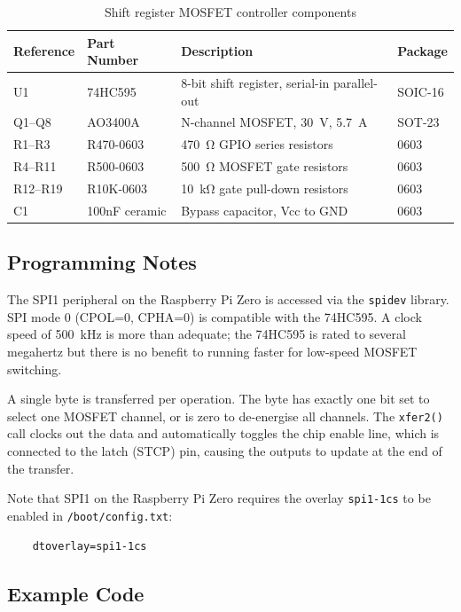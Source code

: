 \begin{table}[h]
\centering
\begin{tabular}{llll}
\hline
\textbf{Reference} & \textbf{Part Number} & \textbf{Description} & \textbf{Package} \\
\hline
U1      & 74HC595           & 8-bit shift register, serial-in parallel-out  & SOIC-16 \\
Q1--Q8  & AO3400A           & N-channel MOSFET, \SI{30}{\volt}, \SI{5.7}{\ampere} & SOT-23 \\
R1--R3  & R470-0603         & \SI{470}{\ohm} GPIO series resistors          & 0603 \\
R4--R11 & R500-0603         & \SI{500}{\ohm} MOSFET gate resistors          & 0603 \\
R12--R19 & R10K-0603        & \SI{10}{\kilo\ohm} gate pull-down resistors   & 0603 \\
C1      & 100nF ceramic     & Bypass capacitor, Vcc to GND                  & 0603 \\
\hline
\end{tabular}
\caption{Shift register MOSFET controller components}
\label{tab:shiftreg_parts}
\end{table}

\subsection{Programming Notes}

The SPI1 peripheral on the Raspberry Pi Zero is accessed via the \texttt{spidev} library.
SPI mode 0 (CPOL=0, CPHA=0) is compatible with the 74HC595. A clock speed of
\SI{500}{\kilo\hertz} is more than adequate; the 74HC595 is rated to several megahertz
but there is no benefit to running faster for low-speed MOSFET switching.

A single byte is transferred per operation. The byte has exactly one bit set to select
one MOSFET channel, or is zero to de-energise all channels. The \texttt{xfer2()} call
clocks out the data and automatically toggles the chip enable line, which is connected
to the latch (STCP) pin, causing the outputs to update at the end of the transfer.

Note that SPI1 on the Raspberry Pi Zero requires the overlay \texttt{spi1-1cs} to be
enabled in \texttt{/boot/config.txt}:

\begin{verbatim}
    dtoverlay=spi1-1cs
\end{verbatim}

\subsection{Example Code}

